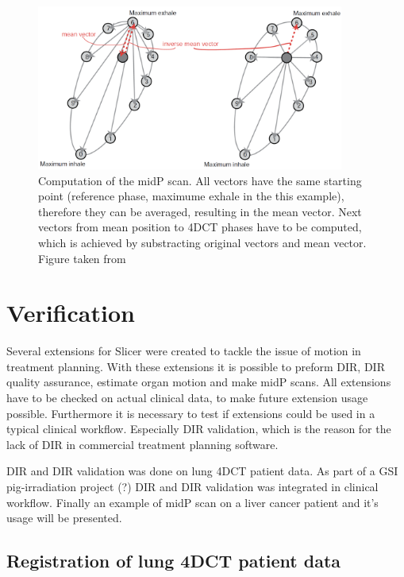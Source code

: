 \documentclass[type=dr, dr=rernat, accentcolor=tud7b,colorbacktitle, bigchapter, openright, twoside, 12pt ]{tudthesis}
\begin{document}
\begin{figure}[H]
\begin{center}
\includegraphics[width=0.9\textwidth]{./Images/midPgeneration.png}
\caption{Computation of the midP scan. All vectors have the same starting point (reference phase, maximume exhale in the this example), therefore they can be averaged, resulting in the mean vector.
	Next vectors from mean position to 4DCT phases have to be computed, which is achieved by substracting original vectors and mean vector. Figure taken from \cite{Wolthaus2008}}
\label{midPgeneration}
\end{center}
\end{figure}



\section{Verification}
\label{Verification}

Several extensions for Slicer were created to tackle the issue of motion in treatment planning. With these extensions it is possible to preform DIR, DIR quality assurance, estimate organ motion and make midP scans. All extensions have to be checked on actual clinical data, to make future extension usage possible. Furthermore it is necessary to test if extensions could be used in a typical clinical workflow. Especially DIR validation, which is the reason for the lack of DIR in commercial treatment planning software. 

DIR and DIR validation was done on lung 4DCT patient data. As part of a GSI pig-irradiation project (?) DIR and DIR validation was integrated in clinical workflow. Finally an example of midP scan on a liver cancer patient and it's usage will be presented.

\subsection{Registration of lung 4DCT patient data}
\end{document}
